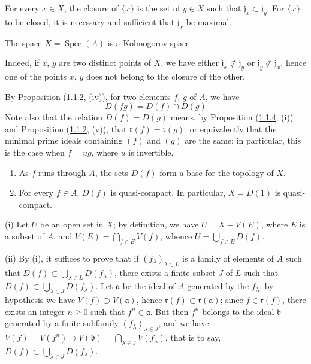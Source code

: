\begin{corollary}[1.1.7]
\label{I.1.1.7}
For every $x\in X$, the closure of $\{x\}$ is the set of $y\in X$ such
that $\mathfrak{j}_x\subset\mathfrak{j}_y$. For $\{x\}$ to be closed, it is
necessary and sufficient that $\mathfrak{j}_x$ be maximal.
\end{corollary}

\begin{corollary}[1.1.8]
\label{I.1.1.8}
The space $X=\operatorname{Spec}(A)$ is a Kolmogorov space.
\end{corollary}

Indeed, if $x$, $y$ are two distinct points of $X$, we have either
$\mathfrak{j}_x\not\subset\mathfrak{j}_y$ or
$\mathfrak{j}_y\not\subset\mathfrak{j}_x$, hence one of the points $x$, $y$
does not belong to the closure of the other.

\begin{env}[1.1.9]
\label{I.1.1.9}
By Proposition (\hyperref[I.1.1.2]{1.1.2}, (iv)), for two elements
$f$, $g$ of $A$, we have
\begin{equation}
  D(fg)=D(f)\cap D(g)
  \tag{1.1.9.1}\label{I.1.1.9.1}
\end{equation}
Note also that the relation $D(f)=D(g)$ means, by Proposition
(\hyperref[I.1.1.4]{1.1.4}, (i)) and Proposition
(\hyperref[I.1.1.2]{1.1.2}, (v)), that
$\mathfrak{r}(f)=\mathfrak{r}(g)$, or equivalently that the minimal prime
ideals containing $(f)$ and $(g)$ are the same; in particular, this is the
case when $f=ug$, where $u$ is invertible.
\end{env}

\begin{proposition}[1.1.10]
\label{I.1.1.10}
\begin{enumerate}
  \item[\rm(i)] As $f$ runs through $A$, the sets $D(f)$ form a
  base for the topology of $X$.
  \item[\rm(ii)] For every $f\in A$, $D(f)$ is quasi-compact. In particular,
  $X=D(1)$ is quasi-compact.
\end{enumerate}
\end{proposition}

(i) Let $U$ be an open set in $X$; by definition, we have
$U=X-V(E)$, where $E$ is a subset of $A$, and
$V(E)=\bigcap_{f\in E}V(f)$, whence $U=\bigcup_{f\in E}D(f)$.

(ii) By (i), it suffices to prove that if $(f_\lambda)_{\lambda\in L}$
is a family of elements of $A$ such that
$D(f)\subset\bigcup_{\lambda\in L}D(f_\lambda)$, there exists a finite subset
$J$ of $L$ such that $D(f)\subset\bigcup_{\lambda\in J}D(f_\lambda)$. Let
$\mathfrak{a}$ be the ideal of $A$ generated by the $f_\lambda$; by
hypothesis we have $V(f)\supset V(\mathfrak{a})$, hence
$\mathfrak{r}(f)\subset\mathfrak{r}(\mathfrak{a})$; since
$f\in\mathfrak{r}(f)$, there exists an integer $n\geq0$ such that
$f^n\in\mathfrak{a}$. But then $f^n$ belongs to the ideal $\mathfrak{b}$
generated by a finite subfamily $(f_\lambda)_{\lambda\in J}$, and we have
$V(f)=V(f^n)\supset V(\mathfrak{b})=\bigcap_{\lambda\in J}V(f_\lambda)$,
that is to say, $D(f)\subset\bigcup_{\lambda\in J}D(f_\lambda)$.

